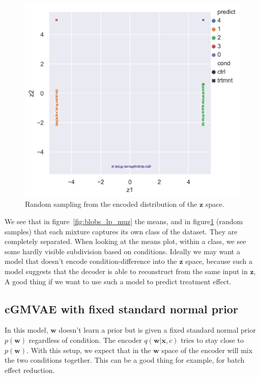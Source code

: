 \documentclass[11pt, a4paper]{report}
\theoremstyle{plain}
\theoremstyle{definition}
\theoremstyle{remark}
\newcommand{\x}{\mathbf{x}}
\newcommand{\z}{\mathbf{z}}
\newcommand{\w}{\mathbf{w}}
\begin{document}
\begin{figure}[h]
\centering
\includegraphics[width=1.1\textwidth]{images/blobs_cgmvae_learnedprior_z.png}
\caption{Random sampling from the encoded distribution of the $\z$ space. 
}
\label{fig:blobs_lp_z}
\end{figure}

We see that in figure~\ref{fig:blobs_lp_muz} the means, and in
figure\ref{fig:blobs_lp_z} (random samples) that each mixture captures its own
class of the dataset. They are completely separated. When looking at the means
plot, within a class, we
see some hardly visible subdivision based on conditions.
Ideally we may want a model that doesn't encode condition-difference into the
$\z$ space, because such a model 
suggests that the decoder is able to reconstruct from the same input in $\z$,
A good thing if we want to use such a
model to predict treatment effect.

\subsection{cGMVAE with fixed standard normal prior}

In this model, $\w$ doesn't learn a prior but is given a fixed standard normal
prior $p(\w)$ regardless of condition.
The encoder $q(\w | \x, c)$ 
tries to stay close to $p(\w)$.
With this setup, we expect that in the $\w$ space of the 
encoder will mix the two conditions together. This can be a good thing for
example, for batch effect reduction.
\end{document}
